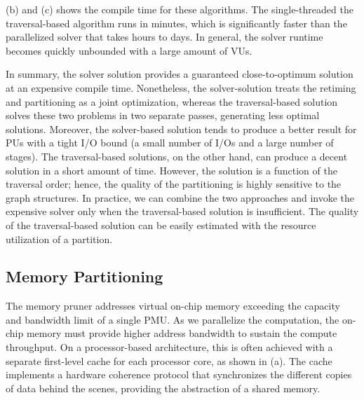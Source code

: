  (b) and (c) shows the compile time for these algorithms. The single-threaded
the traversal-based algorithm runs in minutes, which is significantly faster than the parallelized solver that takes hours to days.
In general, the solver runtime becomes quickly unbounded with a large amount of VUs.

In summary, the solver solution provides a guaranteed close-to-optimum solution at an expensive
compile time. Nonetheless, the solver-solution treats the retiming and partitioning as a joint optimization,
whereas the traversal-based solution solves these two problems in two separate passes,
generating less optimal solutions.
Moreover, the solver-based solution tends to produce a better result for PUs with a tight I/O
bound (a small number of I/Os and a large number of stages).
The traversal-based solutions, on the other hand, can produce a decent solution in a short amount of
time.
However, the solution is a function of the traversal order; hence, the quality of the partitioning
is highly sensitive to the graph structures.
In practice, we can combine the two approaches and invoke the expensive solver only when the
traversal-based solution is insufficient. The quality of the traversal-based solution can be easily
estimated with the resource utilization of a partition.

\subsection{Memory Partitioning} \label{sec:memsplit}
The memory pruner addresses virtual on-chip memory exceeding the capacity and bandwidth limit of a
single PMU.
As we parallelize the computation, the on-chip memory must provide higher address bandwidth to sustain the
compute throughput.
On a processor-based architecture, this is often achieved with a separate first-level
cache for each processor core, as shown in  (a).
The cache implements a hardware coherence protocol that synchronizes the different copies of data
behind the scenes,
providing the abstraction of a shared memory.

